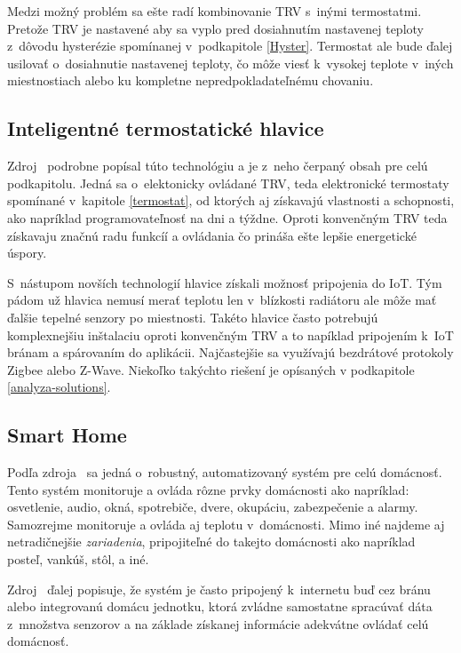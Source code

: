 Medzi možný problém sa ešte radí kombinovanie TRV s~inými termostatmi. 
Pretože TRV je nastavené aby sa vyplo pred dosiahnutím nastavenej teploty z~dôvodu hysterézie spomínanej v~podkapitole \ref{Hyster}. 
Termostat ale bude ďalej usilovať o~dosiahnutie nastavenej teploty, čo môže viesť k~vysokej teplote v~iných miestnostiach alebo ku kompletne nepredpokladateľnému chovaniu.

\subsection{Inteligentné termostatické hlavice}\label{smart-termo}
Zdroj~\cite{morris_2022} podrobne popísal túto technológiu a je z~neho čerpaný obsah pre celú podkapitolu.
Jedná sa o~elektonicky ovládané TRV, teda elektronické termostaty spomínané v~kapitole \ref{termostat}, od ktorých aj získavajú vlastnosti a schopnosti, ako napríklad programovateľnosť na dni a týždne. 
Oproti konvenčným TRV teda získavaju značnú radu funkcíí a ovládania čo prináša ešte lepšie energetické úspory. 

S~nástupom novších technologií hlavice získali možnosť pripojenia do IoT. 
Tým pádom už hlavica nemusí merať teplotu len v~blízkosti radiátoru ale môže mať ďalšie tepelné senzory po miestnosti. 
Takéto hlavice často potrebujú komplexnejšiu inštalaciu oproti konvenčným TRV a to napíklad pripojením k~IoT bránam a spárovaním do aplikácii.
Najčastejšie sa využívajú bezdrátové protokoly Zigbee alebo Z-Wave.
Niekoľko takýchto riešení je opísaných v podkapitole \ref{analyza-solutions}.

\subsection{Smart Home}\label{smart-home}
Podľa zdroja~\cite{1382266} sa jedná o~robustný, automatizovaný systém pre celú domácnosť. 
Tento systém monitoruje a ovláda rôzne prvky domácnosti ako napríklad: osvetlenie, audio, okná, spotrebiče, dvere, okupáciu, zabezpečenie a alarmy. 
Samozrejme monitoruje a ovláda aj teplotu v~domácnosti. 
Mimo iné najdeme aj netradičnejšie \emph{zariadenia}, pripojiteľné do takejto domácnosti ako napríklad posteľ, vankúš, stôl, a iné.

Zdroj~\cite{1382266} ďalej popisuje, že systém je často pripojený k~internetu buď cez bránu alebo integrovanú domácu jednotku, ktorá zvládne samostatne spracúvať dáta z~množstva senzorov a na základe získanej informácie adekvátne ovládať celú domácnosť.


